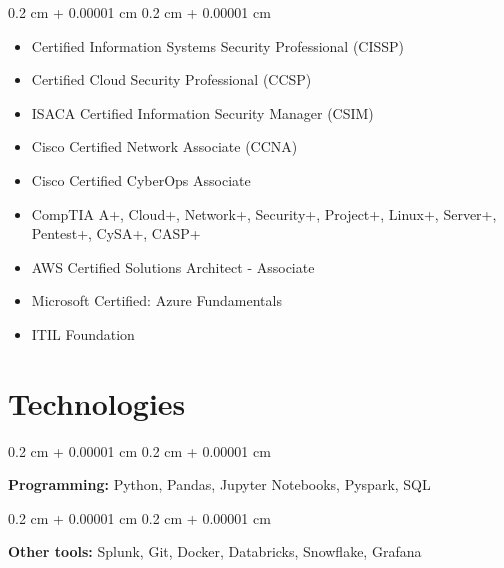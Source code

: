 \documentclass[10pt, letterpaper]{article}
\newenvironment{highlightsforbulletentries}{
    \begin{itemize}[
        topsep=0.10 cm,
        parsep=0.10 cm,
        partopsep=0pt,
        itemsep=0pt,
        leftmargin=10pt
    ]
}{
    \end{itemize}
} %
\newenvironment{onecolentry}{
    \begin{adjustwidth}{
        0.2 cm + 0.00001 cm
    }{
        0.2 cm + 0.00001 cm
    }
}{
    \end{adjustwidth}
} %
\begin{document}
    \begin{onecolentry}
        \begin{highlightsforbulletentries}


        \item Certified Information Systems Security Professional (CISSP)

        \item Certified Cloud Security Professional (CCSP)

        \item ISACA Certified Information Security Manager (CSIM)

        \item Cisco Certified Network Associate (CCNA)

        \item Cisco Certified CyberOps Associate

        \item CompTIA A+, Cloud+, Network+, Security+, Project+, Linux+, Server+, Pentest+, CySA+, CASP+

        \item AWS Certified Solutions Architect - Associate

        \item Microsoft Certified: Azure Fundamentals

        \item ITIL Foundation


        \end{highlightsforbulletentries}
    \end{onecolentry}

    \section{Technologies}



        
        \begin{onecolentry}
            \textbf{Programming:} Python, Pandas, Jupyter Notebooks, Pyspark, SQL
        \end{onecolentry}

        \vspace{0.2 cm}

        \begin{onecolentry}
            \textbf{Other tools:} Splunk, Git, Docker, Databricks, Snowflake, Grafana
        \end{onecolentry}


    
\end{document}
